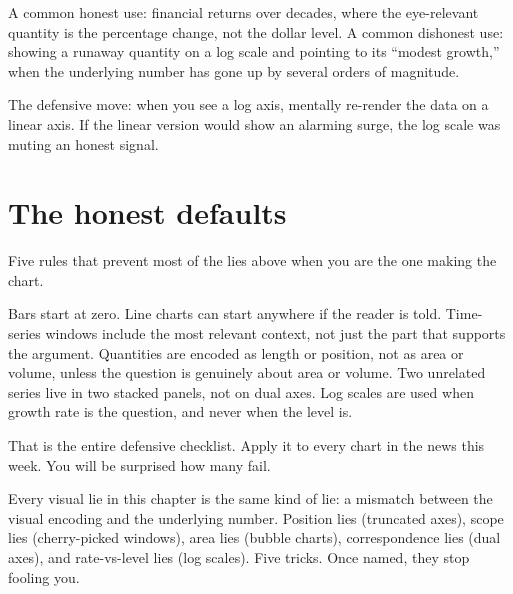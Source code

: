 \documentclass[
  letterpaper,
  11pt,
  twoside,
  openany]{scrbook}
\begin{document}
A common honest use: financial returns over decades, where the
eye-relevant quantity is the percentage change, not the dollar level. A
common dishonest use: showing a runaway quantity on a log scale and
pointing to its ``modest growth,'' when the underlying number has gone
up by several orders of magnitude.

The defensive move: when you see a log axis, mentally re-render the data
on a linear axis. If the linear version would show an alarming surge,
the log scale was muting an honest signal.

\section{The honest defaults}\label{the-honest-defaults}

Five rules that prevent most of the lies above when you are the one
making the chart.

Bars start at zero. Line charts can start anywhere if the reader is
told. Time-series windows include the most relevant context, not just
the part that supports the argument. Quantities are encoded as length or
position, not as area or volume, unless the question is genuinely about
area or volume. Two unrelated series live in two stacked panels, not on
dual axes. Log scales are used when growth rate is the question, and
never when the level is.

That is the entire defensive checklist. Apply it to every chart in the
news this week. You will be surprised how many fail.

\begin{tcolorbox}[enhanced jigsaw, arc=.35mm, bottomrule=.15mm, bottomtitle=1mm, breakable, colback=white, colbacktitle=quarto-callout-warning-color!10!white, colframe=quarto-callout-warning-color-frame, coltitle=black, left=2mm, leftrule=.75mm, opacityback=0, opacitybacktitle=0.6, rightrule=.15mm, title=\textcolor{quarto-callout-warning-color}{\faExclamationTriangle}\hspace{0.5em}{Key insight}, titlerule=0mm, toprule=.15mm, toptitle=1mm]

Every visual lie in this chapter is the same kind of lie: a mismatch
between the visual encoding and the underlying number. Position lies
(truncated axes), scope lies (cherry-picked windows), area lies (bubble
charts), correspondence lies (dual axes), and rate-vs-level lies (log
scales). Five tricks. Once named, they stop fooling you.

\end{tcolorbox}
\end{document}
